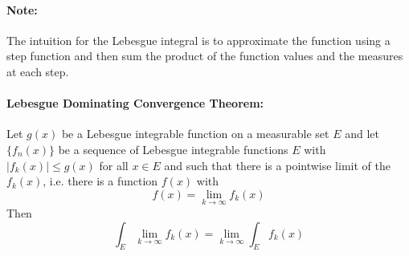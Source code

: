 \documentclass[10pt,a4paper]{article}
\begin{document}
\paragraph{Note:} The intuition for the Lebesgue integral is to approximate the function using a step function and then sum the product of the function values and the measures at each step.

\paragraph{Lebesgue Dominating Convergence Theorem:}  Let $g(x)$ be a Lebesgue integrable function on a measurable set $E$ and let $\{f_n(x)\}$ be a sequence of Lebesgue integrable functions $E$ with $|f_k(x)| \leq g(x)$ for all $x \in E$ and such that there is a pointwise limit of the $f_k(x)$, i.e. there is a function $f(x)$ with
$$ f(x) = \lim_{k \to \infty} f_k(x)$$
Then 
$$ \int_E \lim_{k \to \infty} f_k(x) = \lim_{k \to \infty} \int_E f_k(x)$$
\end{document}
